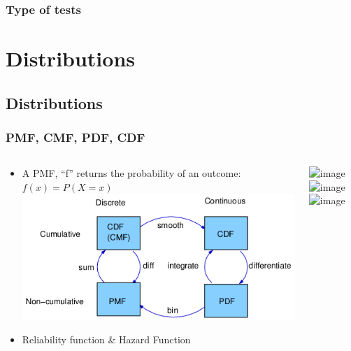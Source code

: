\documentclass{beamer}
\begin{document}
\begin{frame}\frametitle{Type of tests}%
\end{frame}





\section{Distributions}
\subsection{Distributions} 

\begin{frame}\frametitle{PMF, CMF, PDF, CDF}
\begin{columns}
	\begin{column}{5cm}
		\begin{itemize}
			\item<1> A PMF, “f” returns the probability of an outcome: $f(x)=P(X=x)$ 
			\includegraphics[scale=0.35]{CdfPdfPmf} 
			\newline
			\item<2> Reliability function \& Hazard Function
		\end{itemize}
		\vspace{3cm} 
	\end{column}
	\begin{column}{5cm}
		\begin{overprint}		
			\includegraphics<1>[scale=0.3]{PmfCdfContinuous}
			\includegraphics<1>[scale=0.25]{pdfcdfDiscrete}
			\includegraphics<2>[scale=0.32]{cdfpdfrfhf}
		\end{overprint}
	\end{column}
\end{columns}
\end{frame}
\end{document}
